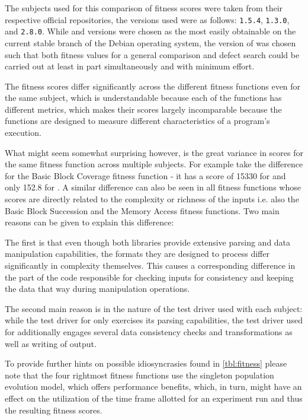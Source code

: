 The subjects used for this comparison of fitness scores were taken from their respective
official repositories, the versions used were as follows: \libpng \texttt{1.5.4}, \libpcap \texttt{1.3.0}, and
\libxml \texttt{2.8.0}. While \libpcap and \libxml versions were chosen as the most easily obtainable on the
current stable branch of the Debian operating system, the version of \libpng was chosen such that both
fitness values for a general comparison and defect search could be carried out at least in part simultaneously
and with minimum effort.

The fitness scores differ significantly across the different fitness functions even for the same subject,
which is understandable because each of the functions has different metrics, which makes their scores
largely incomparable because the functions are designed to measure different characteristics of a
program's execution.

What might seem somewhat surprising however, is the great variance in scores for the same fitness function
across multiple subjects. For example take the difference for the Basic Block Coverage fitness function - it
has a score of 15330 for \libpng and only 152.8 for \libpcap. 
A similar difference can also be seen in all fitness functions whose scores are directly related to the
complexity or richness of the inputs i.e. also the Basic Block Succession and the Memory Access fitness
functions. Two main reasons can be given to explain this difference:

The first is that even though both libraries provide extensive parsing and data manipulation capabilities,
the formats they are designed to process differ significantly in complexity themselves. This causes a
corresponding difference in the part of the code responsible for checking inputs for consistency and keeping
the data that way during manipulation operations.

The second main reason is in the nature of the test driver used with each subject: while the test driver for
\libpcap only exercises its parsing capabilities, the test driver used for \libpng additionally engages several
data consistency checks and transformations as well as writing of output.

To provide further hints on possible idiosyncrasies found in \cref{tbl:fitness} please note that the four
rightmost fitness functions use the singleton population evolution model, which offers performance benefits,
which, in turn, might have an effect on the utilization of the time frame allotted for an experiment run and
thus the resulting fitness scores.

